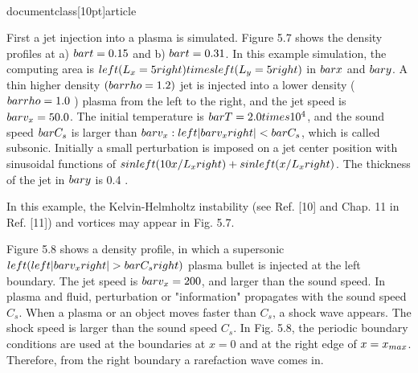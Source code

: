 \\documentclass[10pt]{article}
\begin{document}
{First a jet injection into a plasma is simulated. Figure 5.7 shows the density profiles at a) $\\bar{t}=0.15$ and b) $\\bar{t}=0.31$. In this example simulation, the computing area is $\\left(L_{x}=5\\right) \\times\\left(L_{y}=5\\right)$ in $\\bar{x}$ and $\\bar{y}$. A thin higher density $(\\bar{\\rho}=1.2)$ jet is injected into a lower density ( $\\bar{\\rho}=1.0$ ) plasma from the left to the right, and the jet speed is $\\bar{v}_{x}=50.0$. The initial temperature is $\\bar{T}=2.0 \\times 10^{4}$, and the sound speed $\\bar{C}_{s}$ is larger than $\\bar{v}_{x}:\\left|\\bar{v}_{x}\\right|<\\bar{C}_{s}$, which is called subsonic. Initially a small perturbation is imposed on a jet center position with sinusoidal functions of $\\sin \\left(10 x / L_{x}\\right)+\\sin \\left(x / L_{x}\\right)$. The thickness of the jet in $\\bar{y}$ is 0.4 .

In this example, the Kelvin-Helmholtz instability (see Ref. [10] and Chap. 11 in Ref. [11]) and vortices may appear in Fig. 5.7.

Figure 5.8 shows a density profile, in which a supersonic $\\left(\\left|\\bar{v}_{x}\\right|>\\bar{C}_{s}\\right)$ plasma bullet is injected at the left boundary. The jet speed is $\\bar{v}_{x}=200$, and larger than the sound speed. In plasma and fluid, perturbation or "information" propagates with the sound speed $C_{s}$. When a plasma or an object moves faster than $C_{s}$, a shock wave appears. The shock speed is larger than the sound speed $C_{s}$. In Fig. 5.8, the periodic boundary conditions are used at the boundaries at $x=0$ and at the right edge of $x=x_{\\max }$. Therefore, from the right boundary a rarefaction wave comes in.

}
\end{document}
